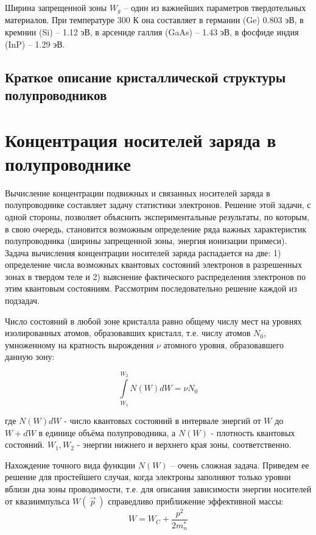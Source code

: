 Ширина запрещенной зоны $W_g$  – один из важнейших параметров твердотельных материалов.
При температуре 300 К она составляет в германии (Ge) 0.803 эВ, в кремнии (Si) – 1.12 эВ, в арсениде галлия (GaAs) – 1.43
эВ, в фосфиде индия (InP) – 1.29 эВ.

\subsection{Краткое описание кристаллической структуры полупроводников}


\section{Концентрация носителей заряда в полупроводнике}
Вычисление концентрации подвижных и связанных носителей заряда в полупроводнике составляет задачу статистики электронов.
Решение этой задачи, с одной стороны, позволяет объяснить экспериментальные результаты, по которым, в свою очередь,
становится возможным определение ряда важных характеристик полупроводника (ширины запрещенной зоны, энергия ионизации примеси).
Задача вычисления концентрации носителей заряда распадается на две:  1) определение числа возможных квантовых состояний
электронов в разрешенных зонах в твердом теле и 2) выяснение фактического распределения электронов по этим квантовым
состояниям. Рассмотрим последовательно решение каждой из подзадач.

Число состояний в любой зоне кристалла равно общему числу мест на уровнях изолированных атомов, образовавших кристалл,
т.е. числу атомов $N_0$, умноженному на кратность вырождения $\nu$ атомного уровня, образовавшего данную зону:

\begin{equation}
	\int \limits_{W_1}^{W_2} N(W) dW  =\nu N_0 
	\label{eq:2.1}
\end{equation} 

где $N(W)dW$ - число  квантовых состояний в интервале энергий от $W$ до $W+dW$ в единице объёма полупроводника, а $N(W)$
-  плотность квантовых состояний. $W_1,W_2$ - энергии нижнего и верхнего края зоны, соответственно. 

Нахождение точного вида функции $N(W)$ – очень сложная задача. Приведем ее решение для простейшего случая, когда электроны
заполняют только уровни вблизи дна зоны проводимости, т.е. для описания зависимости энергии носителей от квазиимпульса
$W(~\vec{p}~)$ справедливо приближение эффективной массы:   
\begin{equation}
	W = W_C + \frac{p^2}{2m_n^*}
	\label{eq:2.2}
\end{equation}

